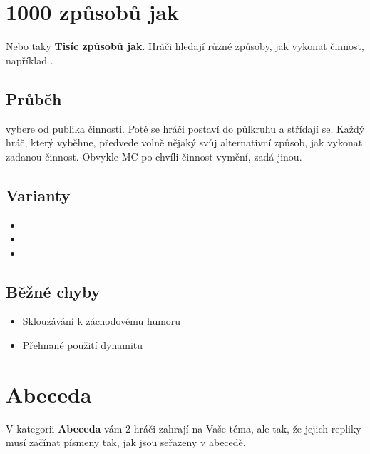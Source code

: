 \documentclass[main.tex]{subfiles}
\begin{document}
\needspace{5cm} \section{1000 způsobů jak} \label{1000 způsobů jak}  
 
 
Nebo taky \textbf{Tisíc způsobů jak}{}. Hráči hledají různé způsoby, jak vykonat činnost, například . 
 
 
\subsection{Průběh}  
 vybere od publika činnosti. Poté se hráči postaví do půlkruhu a střídají se. Každý hráč, který vyběhne, předvede volně nějaký svůj alternativní způsob, jak vykonat zadanou činnost. Obvykle MC po chvíli činnost vymění, zadá jinou. 
 
\subsection{ Varianty } \begin{itemize}
\item  {}
\item  {}
\item  {}
\end{itemize}
 
\subsection{ Běžné chyby } \begin{itemize}
\item Sklouzávání k záchodovému humoru
\item Přehnané použití dynamitu
\end{itemize}
 
 
 
 
 
\needspace{5cm} \section{Abeceda} \label{abeceda}  
 
V kategorii \textbf{Abeceda}{} vám 2 hráči zahrají na Vaše téma, ale tak, že jejich repliky musí začínat písmeny tak, jak jsou seřazeny v abecedě. 
 
\end{document}
